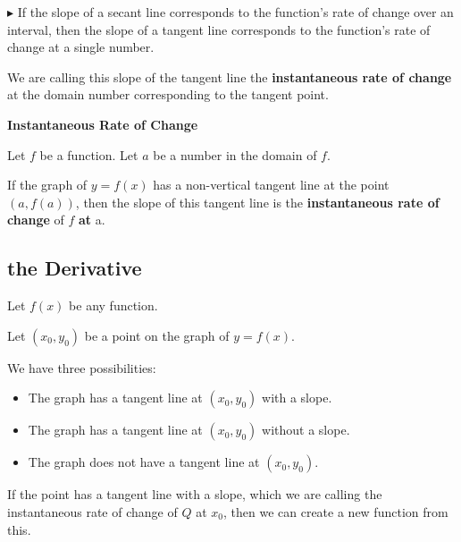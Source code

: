 \documentclass{ximera}
\begin{document}
\textbf{\textcolor{red!90!darkgray}{$\blacktriangleright$}} If the slope of a secant line corresponds to the function's rate of change over an interval, then the slope of a tangent line corresponds to the function's rate of change at a single number.


We are calling this slope of the tangent line the \textbf{\textcolor{purple!85!blue}{instantaneous rate of change}} at the domain number corresponding to the tangent point.




\begin{idea} \textbf{\textcolor{blue!55!black}{Instantaneous Rate of Change}}  

Let $f$ be a function. Let $a$ be a number in the domain of $f$.

If the graph of $y = f(x)$ has a non-vertical tangent line at the point $(a, f(a))$, then the slope of this tangent line is the \textbf{instantaneous rate of change} of $f$ \textbf{at} a.

\end{idea}

















\subsection*{the Derivative}

Let $f(x)$ be any function.

Let $(x_0, y_0)$ be a point on the graph of $y = f(x)$.

We have three possibilities:


\begin{itemize}
\item The graph has a tangent line at $(x_0, y_0)$ with a slope.
\item The graph has a tangent line at $(x_0, y_0)$ without a slope.
\item The graph does not have a tangent line at $(x_0, y_0)$.
\end{itemize}



If the point has a tangent line with a slope, which we are calling the instantaneous rate of change of $Q$ at $x_0$, then we can create a new function from this.
\end{document}
